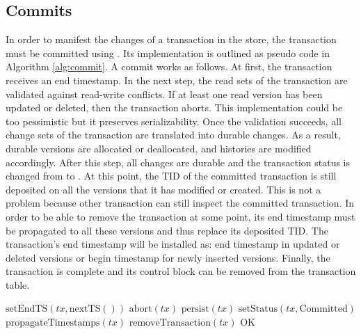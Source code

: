 \subsection{Commits}

In order to manifest the changes of a transaction in the store, the transaction must be committed using . Its implementation is outlined as pseudo code in Algorithm \ref{alg:commit}. A commit works as follows. At first, the transaction receives an end timestamp. In the next step, the read sets of the transaction are validated against read-write conflicts. If at least one read version has been updated or deleted, then the transaction aborts. This implementation could be too pessimistic but it preserves serializability. Once the validation succeeds, all change sets of the transaction are translated into durable changes. As a result, durable versions are allocated or deallocated, and histories are modified accordingly. After this step, all changes are durable and the transaction status is changed from  to . At this point, the TID of the committed transaction is still deposited on all the versions that it has modified or created. This is not a problem because other transaction can still inspect the committed transaction. In order to be able to remove the transaction at some point, its end timestamp must be propagated to all these versions and thus replace its deposited TID.
The transaction's end timestamp will be installed as: end timestamp in updated or deleted versions or begin timestamp for newly inserted versions. Finally, the transaction is complete and its control block can be removed from the transaction table.

\vspace{0.5cm}

\begin{algorithm}
\begin{algorithmic}[1]
\State $\text{setEndTS}(\textit{tx}, \text{nextTS}())$
\State \Return $\text{abort}(\textit{tx})$
\EndIf
\State $\text{persist}(\textit{tx})$
\State $\text{setStatus}(\textit{tx}, \text{Committed})$
\State $\text{propagateTimestamps}(\textit{tx})$
\State $\text{removeTransaction}(\textit{tx})$
\State \Return $\text{OK}$
\EndProcedure
\end{algorithmic}
\caption{}
\label{alg:commit}
\end{algorithm}
